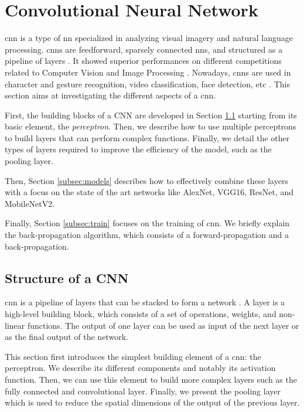 \section{Convolutional Neural Network} \label{sec:cnn}
\acrshort{cnn} is a type of \acrshort{nn} specialized in analyzing visual imagery and natural language processing. \acrshort{cnn}s are feedforward, sparsely connected \acrshort{nn}s, and structured as a pipeline of layers \cite{abdelouahab_accelerating_2018}. It showed superior performances on different competitions related to Computer Vision and Image Processing \cite{khan_survey_2020}. Nowadays, \acrshort{cnn}s are used in character and gesture recognition, video classification, face detection, etc \cite{shawahna_fpga-based_2019}. This section aims at investigating the different aspects of a \acrshort{cnn}.

First, the building blocks of a CNN are developed in Section \ref{subsec:layer} starting from its basic element, the \textit{perceptron}. Then, we describe how to use multiple perceptrons to build layers that can perform complex functions. Finally, we detail the other types of layers required to improve the efficiency of the model, such as the pooling layer.

Then, Section \ref{subsec:models} describes how to effectively combine these layers with a focus on the state of the art networks like AlexNet, VGG16, ResNet, and MobileNetV2.

Finally, Section \ref{subsec:train} focuses on the training of \acrshort{cnn}. We briefly explain the back-propagation algorithm, which consists of a forward-propagation and a back-propagation.
%
%
\subsection{Structure of a CNN} \label{subsec:layer}
%
\acrshort{cnn} is a pipeline of layers that can be stacked to form a network \cite{abdelouahab_accelerating_2018}. A layer is a high-level building block, which consists of a set of operations, weights, and non-linear functions. The output of one layer can be used as input of the next layer or as the final output of the network. 

This section first introduces the simplest building element of a \acrshort{cnn}: the perceptron. We describe its different components and notably its activation function. Then, we can use this element to build more complex layers such as the fully connected and convolutional layer. Finally, we present the pooling layer which is used to reduce the spatial dimensions of the output of the previous layer.
%
%

%

%

%

%

%

%
